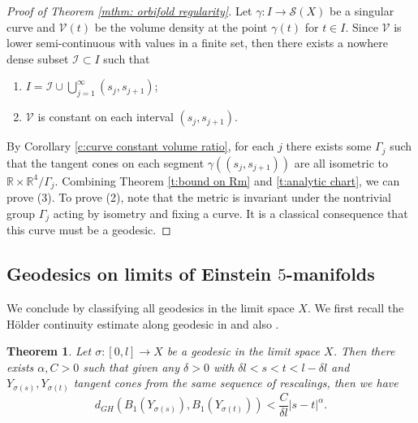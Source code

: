 \documentclass[11pt,reqno]{amsart}
\numberwithin{equation}{section}
\newcommand{\RR}{\mathds{R}}
\newcommand{\cI}{\mathcal{I}}
\newcommand{\cS}{\mathcal{S}}
\newcommand{\cV}{\mathcal{V}}
\newtheorem{theorem}[thm]{Theorem}
\theoremstyle{definition}
\theoremstyle{remark}
\begin{document}
\begin{proof}[Proof of Theorem \ref{mthm: orbifold regularity}]
Let $\gamma: I \to \cS(X)$ be a singular curve and $\cV(t)$ be the volume density at the point $\gamma(t)$ for $t\in I$. Since $\cV$ is lower semi-continuous with values in a finite set, then there exists a nowhere dense subset $\cI \subset I$ such that
\begin{enumerate}
    \item $I = \cI \cup \bigcup_{j=1}^{\infty} (s_j, s_{j+1})$;
    \item $\cV$ is constant on each interval $(s_j,s_{j+1})$. 
\end{enumerate}

By Corollary \ref{c:curve constant volume ratio}, for each $j$ there exists some $\Gamma_j$ such that the tangent cones on each segment $\gamma((s_j,s_{j+1}))$ are all isometric to $\RR\times \RR^4/\Gamma_j$. Combining Theorem \ref{t:bound on Rm} and \ref{t:analytic chart}, we can prove (3). To prove (2), note that the metric is invariant under the nontrivial group $\Gamma_j$ acting by isometry and fixing a curve. It is a classical consequence that this curve must be a geodesic.    
\end{proof}



\subsection{Geodesics on limits of Einstein $5$-manifolds}

We conclude by classifying all geodesics in the limit space $X$. We first recall the H\"older continuity estimate along geodesic in \cite{con12} and also \cite{deng25}.


\begin{theorem}\label{t:continuous tangent cone}
    Let $\sigma:[0,l] \to X$ be a geodesic in the limit space $X$. Then there exists $\alpha,C>0$ such that given any $\delta>0$ with $\delta l <s<t<l -\delta l$ and $Y_{\sigma(s)},Y_{\sigma(t)}$ tangent cones from the same sequence of rescalings, then we have
    \begin{equation*}
        d_{GH}(B_1(Y_{\sigma(s)}), B_1(Y_{\sigma(t)})) < \frac{C}{\delta l}|s-t|^{\alpha}.
    \end{equation*}
\end{theorem}
\end{document}

